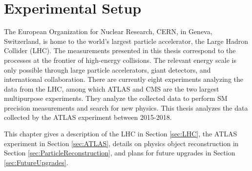 \part{\LARGE{Experimental Setup}}
\label{sec:Experiment}

The European Organization for Nuclear Research, CERN, in Geneva, Switzerland, is home to the world's largest particle accelerator, the Large Hadron Collider (LHC). The measurements presented in this thesis correspond to the processes at the frontier of high-energy collisions. The relevant energy scale is only possible through large particle accelerators, giant detectors, and international collaboration. There are currently eight experiments analyzing the data from the LHC, among which ATLAS and CMS are the two largest multipurpose experiments. They analyze the collected data to perform SM precision measurements and search for new physics. This thesis analyzes the data collected by the ATLAS experiment between 2015-2018.

This chapter gives a description of the LHC in Section \ref{sec:LHC}, the ATLAS experiment in Section \ref{sec:ATLAS}, details on physics object reconstruction in Section \ref{sec:ParticleReconstruction}, and plans for future upgrades in Section \ref{sec:FutureUpgrades}. 
